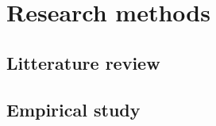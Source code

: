 
\chapter{Research methods}
\label{chapter:mehods}

\section{Litterature review}
\label{section:litterature}

\section{Empirical study}
\label{section:empirical}

